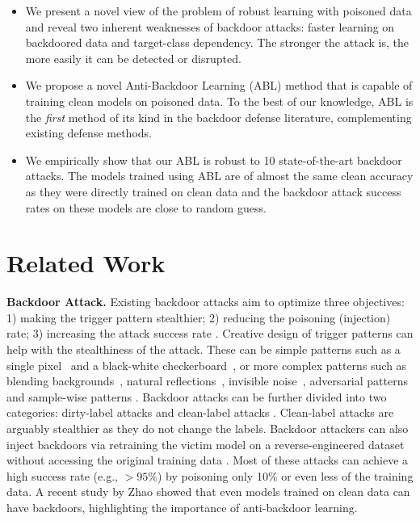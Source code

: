 \begin{itemize}[leftmargin=*]
    \item We present a novel view of the problem of robust learning with poisoned data and reveal two inherent weaknesses of backdoor attacks: faster learning on backdoored data and target-class dependency. The stronger the attack is, the more easily it can be detected or disrupted. 
    \item We propose a novel Anti-Backdoor Learning (ABL) method that is capable of training clean models on poisoned data. To the best of our knowledge, ABL is the \textit{first} method of its kind in the backdoor defense literature, complementing existing defense methods.
    \item We empirically show that our ABL is robust to 10 state-of-the-art backdoor attacks. The models trained using ABL are of almost the same clean accuracy as they were directly trained on clean data and the backdoor attack success rates on these models are close to random guess. 
\end{itemize}

\section{Related Work} \label{sec:2}
\noindent\textbf{Backdoor Attack.} Existing backdoor attacks aim to optimize three objectives: 1) making the trigger pattern stealthier; 2) reducing the poisoning (injection) rate; 3) increasing the attack success rate \cite{li2020backdoor}. Creative design of trigger patterns can help with the stealthiness of the attack. These can be simple patterns such as a single pixel~\cite{tran2018spectral} and a black-white checkerboard~\cite{gu2017badnets}, or more complex patterns such as blending backgrounds~\cite{chen2017targeted}, natural reflections~\cite{liu2020reflection}, invisible noise~\cite{liao2018backdoor,li2019invisible,chen2019invisible,saha2020hidden}, adversarial patterns \cite{zhao2020clean} and sample-wise patterns \cite{nguyen2020input,li2021invisible}. Backdoor attacks can be further divided into two categories: dirty-label attacks \cite{gu2017badnets,chen2017targeted,liu2020reflection} and clean-label attacks \cite{shafahi2018poison,turner2019clean,zhu2019transferable,zhao2020clean,saha2020hidden}. Clean-label attacks are arguably stealthier as they do not change the labels. Backdoor attackers can also inject backdoors via retraining the victim model on a reverse-engineered dataset without accessing the original training data \cite{liu2018trojaning}. Most of these attacks can achieve a high success rate (e.g., $>95\%$) by poisoning only 10\% or even less of the training data. A recent study by Zhao \etal \cite{zhao2021deep} showed that even models trained on clean data can have backdoors, highlighting the importance of anti-backdoor learning.

